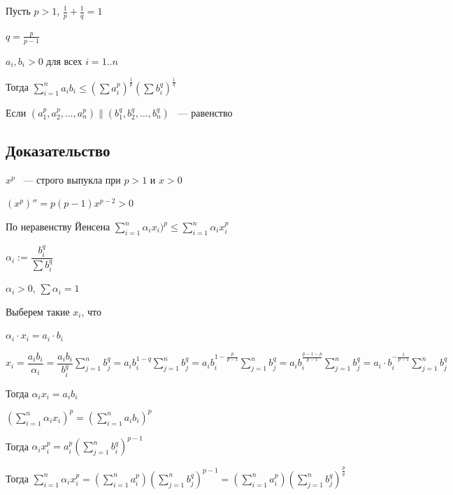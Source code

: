 \documentclass{article}
\begin{document}
            Пусть $p > 1$, $\frac{1}{p} + \frac{1}{q} = 1$
            
            $q = \frac{p}{p - 1}$
            
            $a_i, b_i > 0$ для всех $i = 1..n$
            
            Тогда $\sum\limits^n_{i = 1} a_i b_i \leq (\sum a_i^p)^{\frac{1}{p}} (\sum b_i^q)^{\frac{1}{q}}$
            
            Если $(a_1^p, a_2^p, \ldots, a_n^p) \parallel (b_1^q, b_2^q, \ldots, b_n^q)$ ~--- равенство
            
        \subsection{Доказательство}
            
            $x^p$ ~--- строго выпукла при $p > 1$ и $x > 0$
            
            $(x^p)'' = p(p - 1)x^{p - 2} > 0$
            
            По неравенству Йенсена $\sum\limits_{i = 1}^n \alpha_i x_i)^p \leq \sum\limits_{i = 1}^n \alpha_i x_i^p$
            
            $\alpha_i := \dfrac{b_i^q}{\sum b_i^q}$
            
            $\alpha_i > 0$, $\sum \alpha_i = 1$
            
            Выберем такие $x_i$, что
            
            $\alpha_i \cdot x_i = a_i \cdot b_i$
            
            $x_i = \dfrac{a_i b_i}{\alpha_i} = \dfrac{a_i b_i}{b_i^q} \sum\limits_{j = 1}^n b_j^q = a_i b_i^{1 - q} \sum\limits_{j = 1}^n b_j^q = a_i b_i^{1 - \frac{p}{p - 1}} \sum\limits_{j = 1}^n b_j^q = a_i b_i^{\frac{p - 1 - p}{p - 1}} \sum\limits_{j = 1}^n b_j^q = a_i \cdot b_i^{-\frac{1}{p - 1}} \sum\limits_{j = 1}^n b_j^q$
            
            Тогда $\alpha_i x_i = a_i b_i$
            
            $(\sum\limits_{i = 1}^n \alpha_i x_i)^p = (\sum\limits_{i = 1}^n a_i b_i)^p$
            
            Тогда $\alpha_i x_i^p = a_i^p(\sum\limits_{j = 1}^n b_i^q)^{p - 1}$
            
            Тогда $\sum\limits_{i = 1}^n \alpha_i x_i^p = (\sum\limits_{i = 1}^n a_i^p)(\sum\limits_{j = 1}^n b_j^q)^{p - 1} = (\sum\limits_{i = 1}^n a_i^p)(\sum\limits_{j = 1}^n b_j^q)^{\frac{p}{q}}$
            
\end{document}
